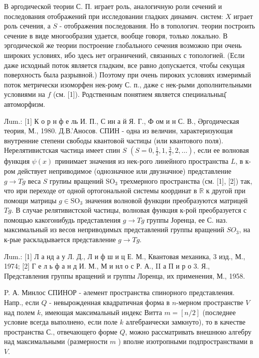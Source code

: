 \documentclass[10pt]{article}
\begin{document}
В әргодической теории С. П. играет роль, аналогичную роли сечений и последования отображений при исследовании гладких динамич. систем: $X$ играет роль сечения, а $S$ - отображения последования. Но в топологич. теории построить сечение в виде многообразия удается, вообще говоря, только локально. В эргодической же теории построение глобального сечения возможно при очень широких условиях, ибо здесь нет ограничений, связанных с топологией. (Если даже исходный поток является гладким, все равно допускается, чтобы секущая поверхность была разрывной.) Поэтому при очень пироких условиях измеримый поток метрически изоморфен нек-рому С. п., даже с нек-рыми дополнительными условиями на $f$ (см. [1]). Родственным понятием является специиальныц̆ автоморфизм.



Лum.: [1] К о р н ф е ль И. П., С ин а й Я. Г., Ф ом и н С. В., Әргодическая теория, М., 1980. Д.В.'Аносов. СПИН - одна из величин, характеризующая внутренние степени свободы квантовой частицы (или квантового поля). Нерелятивистская частица имеет спин $S$ $\left(S=0, \frac{1}{2}, 1, \frac{3}{2}, 2, \ldots\right)$, если ее волновая функция $\psi(x)$ принимает значения из нек-рого линейного пространства $L$, в к-ром действует неприводимое (однозначное или двузначное) представление $g \rightarrow T g$ веса $S$ групиы вращений $\mathrm{SO}_{3}$ трехмерного пространства (см. [1], [2]) так, что ири переходе от одной ортогональной системы координат в $\mathbb{R}$ к другой при помощи матрицы $g \in \mathrm{SO}_{3}$ значения волновой функции преобразуются матрицей $T g$. В случае релятивистской частицы, волновая функция к-рой преобразуется с помощью какогонибудь представления $g \rightarrow T g$ группы Јоренца, ее С. наз. максимальный из весов неприводимых представлений группы вращений $S O_{3}$, на к-рые раскладывается представление $g \rightarrow T g$.



Лum.: [1] Л а нд а у Л. Д., Л и ф ш и ц Е. М., Квантовая механика, 3 изд., М., 1974; [2] Г е л ь ф а н д И. М., М и нл о с Р. А., II а П и р о 3. Я., Представления группы вращений и группы Лоренца, их применения, М., 1958.



P. А. Минлос СПИНОР - әлемент пространства спинорного представления. Напр., если $Q$ - невырожденная квадратичная форма в $n$-мерном пространстве $V$ над полем $k$, имеющая максимальный индекс Витта $m=[n / 2]$ (последнее условие всегда выполнено, если поле $k$ алгебраически замкнуто), то в качестве пространства С., отвечающего форме $Q$, можно рассматривать внешнюю алгебру над максимальными (размерности $m$ ) вполне изотропными подпространствами в $V$.
\end{document}
